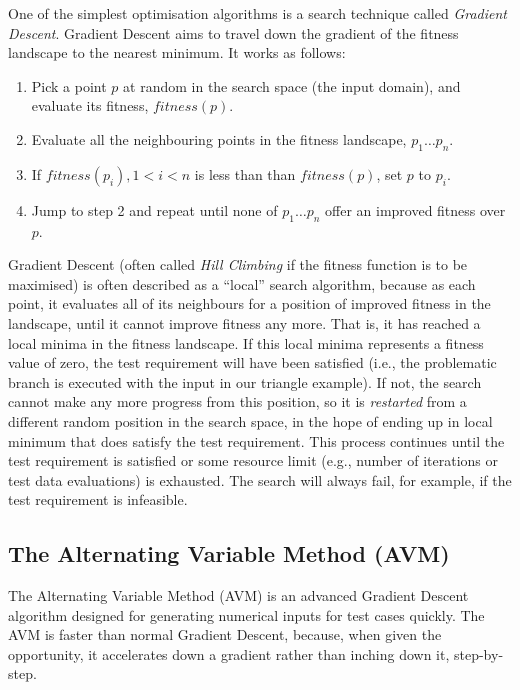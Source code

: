 One of the simplest optimisation algorithms is a search technique called {\it
Gradient Descent}. Gradient Descent aims to travel down the gradient of the
fitness landscape to the nearest minimum. It works as follows:

\begin{enumerate}
    \item Pick a point $p$ at random in the search space (the input domain), and
    evaluate its fitness, $\mathit{fitness}(p)$.

    \item Evaluate all the neighbouring points in the fitness landscape, $p_1
    \dots p_n$.

    \item If $\mathit{fitness}(p_i), 1 < i < n$ is less than than
    $\mathit{fitness}(p)$, set $p$ to $p_i$.

    \item Jump to step 2 and repeat until none of $p_1 \dots p_n$ offer an
    improved fitness over $p$.
\end{enumerate}

Gradient Descent (often called {\it Hill Climbing} if the fitness function is to
be maximised) is often described as a ``local'' search algorithm, because as
each point, it evaluates all of its neighbours for a position of improved
fitness in the landscape, until it cannot improve fitness any more. That is, it
has reached a local minima in the fitness landscape. If this local minima
represents a fitness value of zero, the test requirement will have been
satisfied (i.e., the problematic branch is executed with the input in our
triangle example). If not, the search cannot make any more progress from this
position, so it is {\it restarted} from a different random position in the
search space, in the hope of ending up in local minimum that does satisfy the
test requirement. This process continues until the test requirement is satisfied
or some resource limit (e.g., number of iterations or test data evaluations) is
exhausted. The search will always fail, for example, if the test requirement is
infeasible. 

\subsection{The Alternating Variable Method (AVM)}

The Alternating Variable Method (AVM) is an advanced Gradient Descent algorithm
designed for generating numerical inputs for test cases quickly. The AVM is
faster than normal Gradient Descent, because, when given the opportunity, it
accelerates down a gradient rather than inching down it, step-by-step. 

